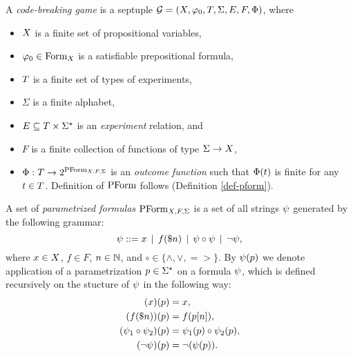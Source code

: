 \begin{definition} \label{def-game}
A \emph{code-breaking game} is a septuple
  $\mathcal{G} = (X, \varphi_0, T, \Sigma, E, F, \Phi)$, where
  \begin{itemize}
  \item $X$ is a finite set of propositional variables,
  \item $\varphi_0 \in \textrm{Form}_X$ is a satisfiable prepositional formula,
  \item $T$ is a finite set of types of experiments,
  \item $\Sigma$ is a finite alphabet,
  \item $E \subseteq T \times \Sigma^\star$ is an \emph{experiment} relation,
  and
  \item $F$ is a finite collection of functions of type $\Sigma -> X$,
  \item $\Phi: T -> 2^{\textrm{PForm}_{X,F,\Sigma}}$ is an
  \emph{outcome function} such that $\Phi(t)$ is finite
  for any $t\in T$. Definition of $\textrm{PForm}$ follows (Definition \ref{def-pform}).
  \end{itemize}
\end{definition}

\begin{definition} \label{def-pform}
A set of \emph{parametrized formulas} $\textrm{PForm}_{X,F,\Sigma}$ is a set of
 all strings $\psi$ generated by the following grammar:
$$ \psi ::= x \:\:|\:\: f(\$n) \:\:|\:\: \psi \circ \psi \:\:|\:\: \neg \psi,$$
where $x\in X$, $f\in F$, $n \in\mathbb{N}$, and $\circ\in\{\wedge, \vee, =>\}$.
By $\psi(p)$ we denote application of a parametrization $p\in\Sigma^\star$
on a formula $\psi$, which is defined recursively on the stucture of $\psi$ in the following way:
\begin{align}
(x)(p) &= x, \\
(f(\$n))(p) &= f(p[n]),\\
(\psi_1\circ\psi_2)(p) &= \psi_1(p) \circ \psi_2(p),\\
(\neg\psi)(p) &= \neg(\psi(p)).
\end{align}
\end{definition}



